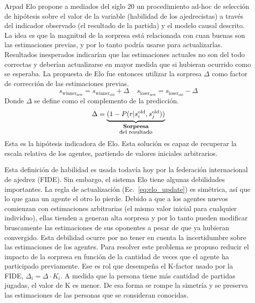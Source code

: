 \documentclass[a4paper,11pt]{book}
\newcommand\hfrac[2]{\genfrac{}{}{0pt}{}{#1}{#2}} %
\theoremstyle{definition}
\begin{document}
Arpad Elo propone a mediados del siglo 20 un procedimiento ad-hoc de selecci\'on de hip\'otesis sobre el valor de la variable (habilidad de los ajedrecistas) a trav\'es del indicador observado (el resultado de la partida) y el modelo causal descrito.
%
La idea es que la magnitud de la sorpresa est\'a relacionada con cuan buenas son las estimaciones previas, y por lo tanto podr\'ia usarse para actualizarlas.
%
Resultados inesperados indicar\'ian que las estimaciones actuales no son del todo correctas y deber\'ian actualizarse en mayor medida que si hubieran ocurrido como se esperaba.
%
La propuesta de Elo fue entonces utilizar la sorpresa $\Delta$ como factor de correcci\'on de las estimaciones previas.
%
\begin{equation}\label{eq:elo_update}
 s_{\text{winner}_\text{new}} = s_{\text{winner}_\text{old}} + \Delta \ \ \ \ \ s_{\text{loser}_\text{new}} = s_{\text{loser}_\text{old}} - \Delta
\end{equation}
%
Donde $\Delta$ se define como el complemento de la predicci\'on.
%
\begin{equation*}
 \Delta = \underbrace{(1 - P(r|s_i^{\text{old}},s_j^{\text{old}}))}_{\hfrac{\textbf{\footnotesize Sorpresa}}{\text{\footnotesize del resultado}}}
\end{equation*}
%
Esta es la hip\'otesis indicadora de Elo.
%
Esta soluci\'on es capaz de recuperar la escala relativa de los agentes, partiendo de valores iniciales arbitrarios.
%
\begin{center}
\end{center}
%
Esta definici\'on de habilidad es usada todav\'ia hoy por la federaci\'on internacional de ajedrez (FIDE).
%
Sin embargo, el sistema Elo tiene algunas debilidades importantes.
%
La regla de actualizaci\'on (Ec.~\eqref{eq:elo_update}) es sim\'etrica, as\'i que lo que gana un agente el otro lo pierde.
%
Debido a que a los agentes nuevos comienzan con estimaciones arbitrarias (el mismo valor inicial para cualquier individuo), ellas tienden a generan alta sorpresa y por lo tanto pueden modificar bruscamente las estimaciones de sus oponentes a pesar de que ya hubieran convergido.
%
Esta debilidad ocurre por no tener en cuenta la incertidumbre sobre las estimaciones de los agentes.
%
Para resolver este problema se propuso reducir el impacto de la sorpresa en funci\'on de la cantidad de veces que el agente ha participado previamente.
%
Ese es rol que desempe\~na el K-factor usado por la FIDE, $\Delta_i = \Delta \cdot K_i$.
%
A medida que la persona tiene m\'as cantidad de partidas jugadas, el valor de K es menor.
%
De esa forma se rompe la simetr\'ia y se preserva las estimaciones de las personas que se consideran conocidas.
\end{document}
